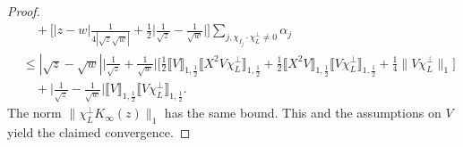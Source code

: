 \begin{proof}
\begin{equation*}
\begin{split}
   & \quad + \Big[|z-w| \frac{1}{4|\sqrt{z}\sqrt{w}|} 
           +\frac{1}{2} \Big|\frac{1}{\sqrt{z}} - \frac{1}{\sqrt{w}}\Big|\Big]\sum_{j,\chi_{I_j}\cdot\chi_L^\perp\neq 0}\alpha_j \\
   & \leq |\sqrt{z}-\sqrt{w}| \Big|\frac{1}{\sqrt{z}}+\frac{1}{\sqrt{w}}\Big| 
            \Big[\frac{1}{2}\llbracket V\rrbracket_{1,\frac{1}{2}} \llbracket X^2 V\chi_L^\perp\rrbracket_{1,\frac{1}{2}} 
               + \frac{1}{2}\llbracket X^2 V\rrbracket_{1,\frac{1}{2}}\llbracket V\chi_L^\perp\rrbracket_{1,\frac{1}{2}}  
               + \frac{1}{4} \|V\chi_L^\perp\|_1 \Big]  \\
   & \quad + \Big|\frac{1}{\sqrt{z}}-\frac{1}{\sqrt{w}}\Big| \llbracket V\rrbracket_{1,\frac{1}{2}} \llbracket V\chi_L^\perp\rrbracket_{1,\frac{1}{2}}.
\end{split}
\end{equation*}
The norm $\| \chi_L^\perp K_\infty(z) \|_1$ has the same bound. This and the assumptions on $V$ yield the claimed convergence.
\end{proof}

